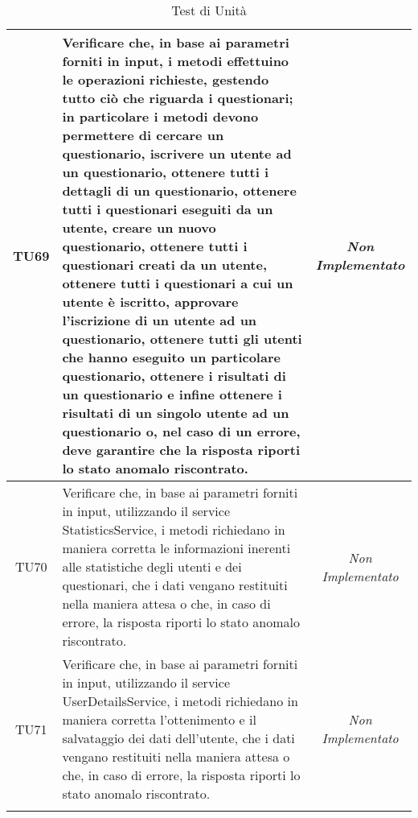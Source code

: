 \begin{longtable}{|c|>{}m{10cm}|c|}
\hypertarget{TU69}{TU69} & Verificare che, in base ai parametri forniti in input, i metodi effettuino le operazioni richieste, gestendo tutto ciò che riguarda i questionari; in particolare i metodi devono permettere di cercare un questionario, iscrivere un utente ad un questionario, ottenere tutti i dettagli di un questionario, ottenere tutti i questionari eseguiti da un utente, creare un nuovo questionario, ottenere tutti i questionari creati da un utente, ottenere tutti i questionari a cui un utente è iscritto, approvare l'iscrizione di un utente ad un questionario, ottenere tutti gli utenti che hanno eseguito un particolare questionario, ottenere i risultati di un questionario e infine ottenere i risultati di un singolo utente ad un questionario o, nel caso di un errore, deve garantire che la risposta riporti lo stato anomalo riscontrato. & \textit{Non Implementato}\\ \hline
\hypertarget{TU70}{TU70} & Verificare che, in base ai parametri forniti in input, utilizzando il service StatisticsService, i metodi richiedano in maniera corretta le informazioni inerenti alle statistiche degli utenti e dei questionari, che i dati vengano restituiti nella maniera attesa o che, in caso di errore, la risposta riporti lo stato anomalo riscontrato. & \textit{Non Implementato}\\ \hline
\hypertarget{TU71}{TU71} & Verificare che, in base ai parametri forniti in input, utilizzando il service UserDetailsService, i metodi richiedano in maniera corretta l'ottenimento  e il salvataggio dei dati dell'utente, che i dati vengano restituiti nella maniera attesa o che, in caso di errore, la risposta riporti lo stato
anomalo riscontrato. & \textit{Non Implementato}\\ \hline
\caption[Test di Unità]{Test di Unità}
\label{tabella:test3}
\end{longtable}
\clearpage
